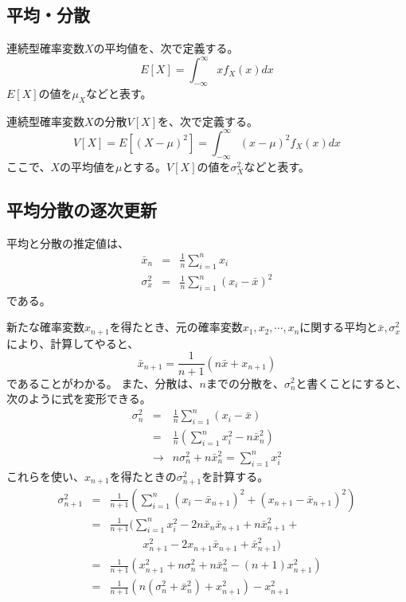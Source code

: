 
\subsection{平均・分散}
\begin{defi}
 連続型確率変数$X$の平均値を、次で定義する。
 \begin{equation*}
  E[X] = \int_{-\infty}^{\infty} xf_X(x)dx
 \end{equation*}
 $E[X]$の値を$\mu_X$などと表す。
\end{defi}

\begin{defi}
 連続型確率変数$X$の分散$V[X]$を、次で定義する。
 \begin{equation*}
  V[X] = E[(X-\mu)^2] = \int_{-\infty}^{\infty} (x-\mu)^2 f_X(x)dx
 \end{equation*}
ここで、$X$の平均値を$\mu$とする。$V[X]$の値を$\sigma_X^2$などと表す。
\end{defi}


\subsection{平均分散の逐次更新}
平均と分散の推定値は、
\begin{eqnarray*}
    \bar{x}_n &=& \frac{1}{n}\sum_{i=1}^n x_i \\
    \sigma_x^2 &=& \frac{1}{n} \sum_{i=1}^n (x_i-\bar{x})^2
\end{eqnarray*}
である。

新たな確率変数$x_{n+1}$を得たとき、元の確率変数$x_1,x_2,\cdots,x_n$に関する平均と$\bar{x},\sigma_x^2$により、計算してやると、
\begin{equation*}
    \bar{x}_{n+1} = \frac{1}{n+1}(n\bar{x}+x_{n+1})
\end{equation*}
であることがわかる。
また、分散は、$n$までの分散を、$\sigma_n^2$と書くことにすると、次のように式を変形できる。
\begin{eqnarray*}
    \sigma_n^2&=&\frac{1}{n}\sum_{i=1}^n(x_i-\bar{x})\\
    &=& \frac{1}{n}(\sum_{i=1}^n x_i^2-n\bar{x}_n^2)\\
    &\rightarrow& n\sigma^2_n+n\bar{x}_n^2 = \sum_{i=1}^n x_i^2
\end{eqnarray*}
これらを使い、$x_{n+1}$を得たときの$\sigma_{n+1}^2$を計算する。
\begin{eqnarray*}
    \sigma_{n+1}^2 &=& \frac{1}{n+1}(\sum_{i=1}^n (x_i-\bar{x}_{n+1})^2+(x_{n+1}-\bar{x}_{n+1})^2 ) \\
    &=& \frac{1}{n+1}(\sum_{i=1}^nx_i^2-2n\bar{x}_n\bar{x}_{n+1}+n\bar{x}^2_{n+1}+\\
    & &\qquad\quad x_{n+1}^2-2x_{n+1}\bar{x}_{n+1}+\bar{x}_{n+1}^2)\\
    &=& \frac{1}{n+1}(x_{n+1}^2
    +n\sigma_n^2+n\bar{x}_n^2-(n+1)x_{n+1}^2)\\
    &=& \frac{1}{n+1}(n(\sigma_n^2+\bar{x}_n^2)+x_{n+1}^2)-x_{n+1}^2
\end{eqnarray*}

